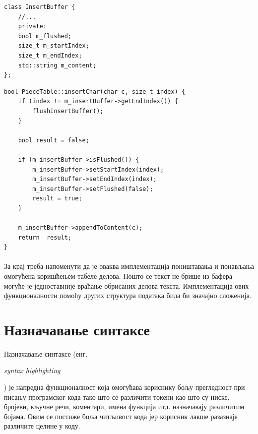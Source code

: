 \documentclass[12pt,oneside]{memoir}
\begin{document}
\begin{verbatim}
class InsertBuffer {
	//...
	private:
	bool m_flushed;
	size_t m_startIndex;
	size_t m_endIndex;
	std::string m_content;
};
\end{verbatim}

\begin{verbatim}
bool PieceTable::insertChar(char c, size_t index) {
	if (index != m_insertBuffer->getEndIndex()) {
		flushInsertBuffer();
	}
	
	bool result = false;
	
	if (m_insertBuffer->isFlushed()) {
		m_insertBuffer->setStartIndex(index);
		m_insertBuffer->setEndIndex(index);
		m_insertBuffer->setFlushed(false);
		result = true;
	}
	
	m_insertBuffer->appendToContent(c);
	return  result;
}
\end{verbatim}

\paragraph{}
За крај треба напоменути да је оваква имплементација поништавања и понављања
омогућена коришћењем табеле делова. Пошто се текст не брише из бафера могуће
је једноставније враћање обрисаних делова текста. Имплементација ових 
функционалности помоћу других структура података била би значајно сложенија.

\section{Назначавање синтаксе}

\paragraph{}
Назначавање синтаксе (енг. \begin{latinica}\textit{syntax highlighting}\end{latinica})
је напредна функционалност која омогућава кориснику бољу прегледност при писању
програмског кода тако што се различити токени као што су ниске, бројеви, кључне речи, коментари, имена функција итд. назначавају различитим бојама.  Овим се постиже боља читљивост кода јер корисник лакше разазнаје различите целине у коду.
\end{document}
